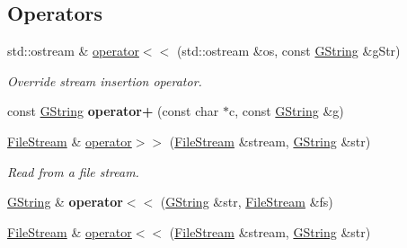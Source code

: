 \subsection*{Operators}
\begin{DoxyCompactItemize}
\item 
\mbox{\label{classrev_1_1_g_string_aee53c80e4f860754e744a20d1c6691cf}} 
std\+::ostream \& \mbox{\hyperlink{classrev_1_1_g_string_aee53c80e4f860754e744a20d1c6691cf}{operator$<$$<$}} (std\+::ostream \&os, const \mbox{\hyperlink{classrev_1_1_g_string}{G\+String}} \&g\+Str)
\begin{DoxyCompactList}\small\item\em Override stream insertion operator. \end{DoxyCompactList}\item 
\mbox{\label{classrev_1_1_g_string_abababa6cba361f91d2cb1b0128f849e6}} 
const \mbox{\hyperlink{classrev_1_1_g_string}{G\+String}} {\bfseries operator+} (const char $\ast$c, const \mbox{\hyperlink{classrev_1_1_g_string}{G\+String}} \&g)
\item 
\mbox{\label{classrev_1_1_g_string_a07bd01b1b1697b55e17251eaff64b138}} 
\mbox{\hyperlink{classrev_1_1_file_stream}{File\+Stream}} \& \mbox{\hyperlink{classrev_1_1_g_string_a07bd01b1b1697b55e17251eaff64b138}{operator$>$$>$}} (\mbox{\hyperlink{classrev_1_1_file_stream}{File\+Stream}} \&stream, \mbox{\hyperlink{classrev_1_1_g_string}{G\+String}} \&str)
\begin{DoxyCompactList}\small\item\em Read from a file stream. \end{DoxyCompactList}\item 
\mbox{\label{classrev_1_1_g_string_a4d39ab8a0eacdce89009d84d31be3f23}} 
\mbox{\hyperlink{classrev_1_1_g_string}{G\+String}} \& {\bfseries operator$<$$<$} (\mbox{\hyperlink{classrev_1_1_g_string}{G\+String}} \&str, \mbox{\hyperlink{classrev_1_1_file_stream}{File\+Stream}} \&fs)
\item 
\mbox{\label{classrev_1_1_g_string_a5b16f7cab2513b145a282a410429976d}} 
\mbox{\hyperlink{classrev_1_1_file_stream}{File\+Stream}} \& \mbox{\hyperlink{classrev_1_1_g_string_a5b16f7cab2513b145a282a410429976d}{operator$<$$<$}} (\mbox{\hyperlink{classrev_1_1_file_stream}{File\+Stream}} \&stream, \mbox{\hyperlink{classrev_1_1_g_string}{G\+String}} \&str)

\end{DoxyCompactItemize}
